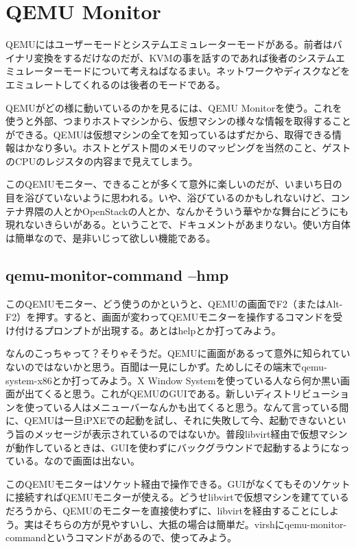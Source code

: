 \documentclass[9pt,b5paper,tombo]{jsbook}
\begin{document}
\section{QEMU Monitor}

QEMUにはユーザーモードとシステムエミュレーターモードがある。前者はバイナリ変換をするだけなのだが、KVMの事を話すのであれば後者のシステムエミュレーターモードについて考えねばなるまい。ネットワークやディスクなどをエミュレートしてくれるのは後者のモードである。

QEMUがどの様に動いているのかを見るには、QEMU Monitorを使う。これを使うと外部、つまりホストマシンから、仮想マシンの様々な情報を取得することができる。QEMUは仮想マシンの全てを知っているはずだから、取得できる情報はかなり多い。ホストとゲスト間のメモリのマッピングを当然のこと、ゲストのCPUのレジスタの内容まで見えてしまう。

このQEMUモニター、できることが多くて意外に楽しいのだが、いまいち日の目を浴びていないように思われる。いや、浴びているのかもしれないけど、コンテナ界隈の人とかOpenStackの人とか、なんかそういう華やかな舞台にどうにも現れないきらいがある。ということで、ドキュメントがあまりない。使い方自体は簡単なので、是非いじって欲しい機能である。

\subsection{qemu-monitor-command --hmp}

このQEMUモニター、どう使うのかというと、QEMUの画面でF2（またはAlt-F2）を押す。すると、画面が変わってQEMUモニターを操作するコマンドを受け付けるプロンプトが出現する。あとはhelpとか打ってみよう。

なんのこっちゃって？そりゃそうだ。QEMUに画面があるって意外に知られていないのではないかと思う。百聞は一見にしかず。ためしにその端末でqemu-system-x86とか打ってみよう。X Window Systemを使っている人なら何か黒い画面が出てくると思う。これがQEMUのGUIである。新しいディストリビューションを使っている人はメニューバーなんかも出てくると思う。なんて言っている間に、QEMUは一旦iPXEでの起動を試し、それに失敗して今、起動できないという旨のメッセージが表示されているのではないか。普段libvirt経由で仮想マシンが動作しているときは、GUIを使わずにバックグラウンドで起動するようになっている。なので画面は出ない。

このQEMUモニターはソケット経由で操作できる。GUIがなくてもそのソケットに接続すればQEMUモニターが使える。どうせlibvirtで仮想マシンを建てているだろうから、QEMUのモニターを直接使わずに、libvirtを経由することにしよう。実はそちらの方が見やすいし、大抵の場合は簡単だ。virshにqemu-monitor-commandというコマンドがあるので、使ってみよう。
\end{document}
